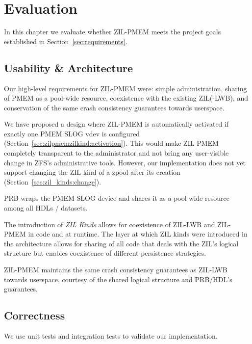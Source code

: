 \documentclass[12pt,a4paper,twoside]{book}
\begin{document}
\chapter{Evaluation}\label{ch:eval}
In this chapter we evaluate whether ZIL-PMEM meets the project goals established in Section~\ref{sec:requirements}.

\section{Usability \& Architecture}

Our high-level requirements for ZIL-PMEM were: simple administration, sharing of PMEM as a pool-wide resource, coexistence with the existing ZIL(-LWB), and conservation of the same crash consistency guarantees towards userspace.
\begin{description}[noitemsep]
    \item[Simple Administration] We have proposed a design where ZIL-PMEM is automatically activated if exactly one PMEM SLOG vdev is configured (Section~\ref{sec:zilpmemzilkind:activation}).
        This would make ZIL-PMEM completely transparent to the administrator and not bring any user-visible change in ZFS's administrative tools.
        However, our implementation does not yet support changing the ZIL kind of a zpool after its creation (Section~\ref{sec:zil_kinds:change}).
    \item[Pooled Storage] PRB wraps the PMEM SLOG device and shares it as a pool-wide resource among all HDLs / datasets.
    \item[Coexistence] The introduction of \textit{ZIL Kinds} allows for coexistence of ZIL-LWB and ZIL-PMEM in code and at runtime.
        The layer at which ZIL kinds were introduced in the architecture allows for sharing of all code that deals with the ZIL's logical structure but enables coexistence of different persistence strategies.
    \item[Same Guarantees] ZIL-PMEM maintains the same crash consistency guarantees as ZIL-LWB towards userspace, courtesy of the shared logical structure and PRB/HDL's guarantees.
\end{description}

\section{Correctness}

We use unit tests and integration tests to validate our implementation.
\end{document}
